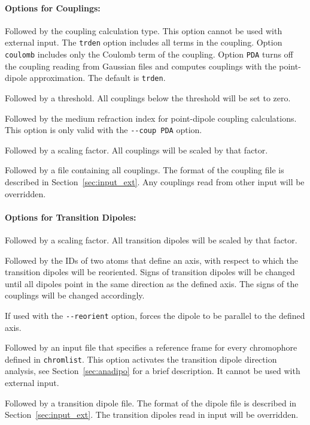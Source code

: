 \documentclass[a4paper,11pt]{article}
\begin{document}
\paragraph*{Options for Couplings:}
\begin{description}[labelsep=10pt, align=left, labelwidth=80pt,labelindent=0pt,leftmargin=90pt]
\item[\texttt{-{}-coup}] Followed by the coupling calculation type. This option cannot be used with external input. The \texttt{trden} option includes all terms in the coupling. Option \texttt{coulomb} includes only the Coulomb term of the coupling. Option \texttt{PDA} turns off the coupling reading from Gaussian files and computes couplings with the point-dipole approximation. The default is \texttt{trden}.
\item[\texttt{-{}-cleancoup}] Followed by a threshold. All couplings below the threshold will be set to zero.
\item[\texttt{-{}-refrind}] Followed by the medium refraction index for point-dipole coupling calculations. This option is only valid with the \texttt{-{}-coup PDA} option.
\item[\texttt{-{}-scalecoup}] Followed by a scaling factor. All couplings will be scaled by that factor. 
\item[\texttt{-{}-incoup}] Followed by a file containing all couplings. The format of the coupling file is described in Section~\ref{sec:input_ext}. Any couplings read from other input will be overridden.
\end{description}

\paragraph*{Options for Transition Dipoles:}
\begin{description}[labelsep=10pt, align=left, labelwidth=80pt,labelindent=0pt,leftmargin=90pt]
\item[\texttt{-{}-scaledipo}] Followed by a scaling factor. All transition dipoles will be scaled by that factor.  
\item[\texttt{-{}-reorient}] Followed by the IDs of two atoms that define an axis, with respect to which the transition dipoles will be reoriented. Signs of transition dipoles will be changed until all dipoles point in the same direction as the defined axis. The signs of the couplings will be changed accordingly.
\item[\texttt{-{}-forcedipo}] If used with the \texttt{-{}-reorient} option, forces the dipole to be parallel to the defined axis.
\item[\texttt{-{}-anadipo}] Followed by an input file that specifies a reference frame for every chromophore defined in \texttt{chromlist}. This option activates the transition dipole direction analysis, see Section~\ref{sec:anadipo} for a brief description. It cannot be used with external input.
\item[\texttt{-{}-incent}] Followed by a transition dipole file. The format of the dipole file is described in Section~\ref{sec:input_ext}. The transition dipoles read in input will be overridden.
\end{description}
\end{document}
